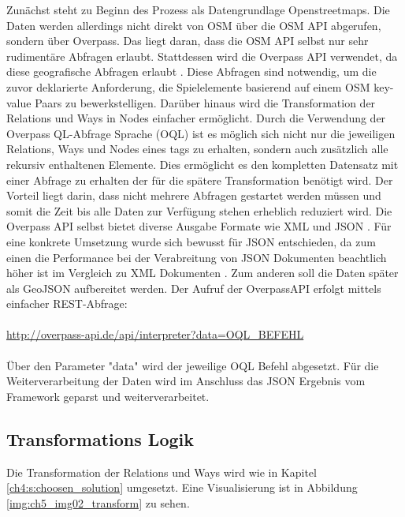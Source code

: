 Zunächst steht zu Beginn des Prozess als Datengrundlage Openstreetmaps.
Die Daten werden allerdings nicht direkt von OSM über die OSM API abgerufen, sondern über Overpass. Das liegt daran, dass die OSM API selbst nur sehr rudimentäre Abfragen erlaubt.
Stattdessen wird die Overpass API verwendet, da diese geografische Abfragen erlaubt \cite{Meyer.2013}.
Diese Abfragen sind notwendig, um die zuvor deklarierte Anforderung, die Spielelemente basierend auf einem OSM key-value Paars zu bewerkstelligen. Darüber hinaus wird die Transformation der Relations und Ways in Nodes einfacher ermöglicht.
Durch die Verwendung der Overpass QL-Abfrage Sprache (OQL) ist es möglich sich nicht nur die jeweiligen Relations, Ways und Nodes eines tags zu erhalten, sondern auch zusätzlich alle rekursiv enthaltenen Elemente. Dies ermöglicht es den kompletten Datensatz mit einer Abfrage zu erhalten der für die spätere Transformation benötigt wird. Der Vorteil liegt darin, dass nicht mehrere Abfragen gestartet werden müssen und somit die Zeit bis alle Daten zur Verfügung stehen erheblich reduziert wird. Die Overpass API selbst bietet diverse Ausgabe Formate wie XML und JSON \cite{Olbricht.2014}. Für eine konkrete Umsetzung wurde sich bewusst für JSON entschieden, da zum einen die Performance bei der Verabreitung von JSON Dokumenten beachtlich höher ist im Vergleich zu XML Dokumenten \cite{Nurseitov.2009}. Zum anderen soll die Daten später als GeoJSON aufbereitet werden.
Der Aufruf der OverpassAPI erfolgt mittels einfacher REST-Abfrage:
\\\\
\url{http://overpass-api.de/api/interpreter?data=OQL_BEFEHL}
\\\\
Über den Parameter "data" wird der jeweilige OQL Befehl abgesetzt.
Für die Weiterverarbeitung der Daten wird im Anschluss das JSON Ergebnis vom Framework geparst und weiterverarbeitet.

\subsection*{Transformations Logik}

Die Transformation der Relations und Ways wird wie in Kapitel \ref{ch4:s:choosen_solution} umgesetzt. Eine Visualisierung ist in Abbildung \ref{img:ch5_img02_transform} zu sehen.

